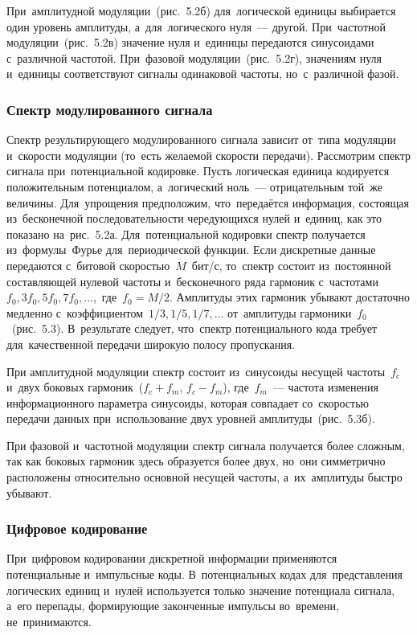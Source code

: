 \documentclass[
	a4paper,
	oneside,
	BCOR = 10mm,
	DIV = 12,
	12pt,
	headings = normal,
]{scrartcl}
\begin{document}
					При~амплитудной модуляции~(рис.~5.2б) для~логической единицы выбирается один уровень амплитуды, а~для~логического нуля~— другой. При~частотной модуляции~(рис.~5.2в) значение нуля и~единицы передаются синусоидами с~различной частотой. При~фазовой модуляции~(рис.~5.2г), значениям нуля и~единицы соответствуют сигналы одинаковой частоты, но~с~различной фазой.

				\subsubsection{Спектр модулированного сигнала}
					Спектр результирующего модулированного сигнала зависит от~типа модуляции и~скорости модуляции (то~есть желаемой скорости передачи). Рассмотрим спектр сигнала при~потенциальной кодировке. Пусть логическая единица кодируется положительным потенциалом, а~логический ноль~— отрицательным той~же величины. Для~упрощения предположим, что~передаётся информация, состоящая из~бесконечной последовательности чередующихся нулей и~единиц, как это показано на~рис.~5.2а. Для~потенциальной кодировки спектр получается из~формулы~Фурье для~периодической функции. Если дискретные данные передаются с~битовой скоростью~$M$~бит/с, то~спектр состоит из~постоянной составляющей нулевой частоты и~бесконечного ряда гармоник с~частотами~$f_0, 3f_0, 5f_0, 7f_0, \dots$,~где~$f_0 = M / 2$. Амплитуды этих гармоник убывают достаточно медленно с~коэффициентом~$1/3, 1/5, 1/7, \dots$ от~амплитуды гармоники~$f_0$~(рис.~5.3). В~результате следует, что~спектр потенциального кода требует для~качественной передачи широкую полосу пропускания.

					При амплитудной модуляции спектр состоит из~синусоиды несущей частоты~$f_c$ и~двух боковых гармоник~($f_c + f_m$, $f_c - f_m$), где~$f_m$~— частота изменения информационного параметра синусоиды, которая совпадает со~скоростью передачи данных при~использование двух уровней амплитуды~(рис.~5.3б). 

					При фазовой и~частотной модуляции спектр сигнала получается более сложным, так как боковых гармоник здесь образуется более двух, но~они симметрично расположены относительно основной несущей частоты, а~их~амплитуды быстро убывают.

				\subsubsection{Цифровое кодирование}
					При~цифровом кодировании дискретной информации применяются потенциальные и~импульсные коды. В~потенциальных кодах для~представления логических единиц и~нулей используется только значение потенциала сигнала, а~его перепады, формирующие законченные импульсы во~времени, не~принимаются. 
\end{document}
